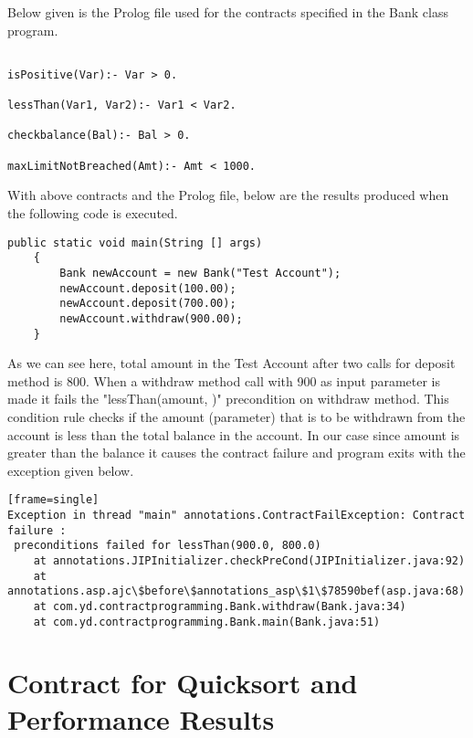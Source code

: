 \begin{minipage}{\linewidth}
Below given is the Prolog file used for the contracts specified in the Bank class program.

\lstset{caption=bankprolog.pl, captionpos=b, breaklines=true, showstringspaces=false}       
\begin{lstlisting}[frame=single]

isPositive(Var):- Var > 0.

lessThan(Var1, Var2):- Var1 < Var2.

checkbalance(Bal):- Bal > 0.

maxLimitNotBreached(Amt):- Amt < 1000.

\end{lstlisting}
\end{minipage}


\begin{minipage}{\linewidth}
With above contracts and the Prolog file, below are the results produced when the following code is executed.
\lstset{language=Java, caption=Java Contracts for Bank class, captionpos=b, breaklines=true, showstringspaces=false}       
\begin{lstlisting}[frame=single]
	public static void main(String [] args)
	{
		Bank newAccount = new Bank("Test Account");
		newAccount.deposit(100.00);
		newAccount.deposit(700.00);
		newAccount.withdraw(900.00);
	}
\end{lstlisting}
\end{minipage}

As we can see here, total amount in the Test Account after two calls for deposit method is 800. When a withdraw method call with 900 as input parameter is made it fails the "lessThan(amount, \@balance)"  precondition on withdraw method. This condition rule checks if the amount (parameter) that is to be withdrawn from the account is less than the total balance in the account. In our case since amount is greater than the balance it causes the contract failure and program exits with the exception given below.

\begin{verbatim}[frame=single]
Exception in thread "main" annotations.ContractFailException: Contract failure :
 preconditions failed for lessThan(900.0, 800.0)
	at annotations.JIPInitializer.checkPreCond(JIPInitializer.java:92)
	at annotations.asp.ajc\$before\$annotations_asp\$1\$78590bef(asp.java:68)
	at com.yd.contractprogramming.Bank.withdraw(Bank.java:34)
	at com.yd.contractprogramming.Bank.main(Bank.java:51)
\end{verbatim}


\section{Contract for Quicksort and Performance Results}





